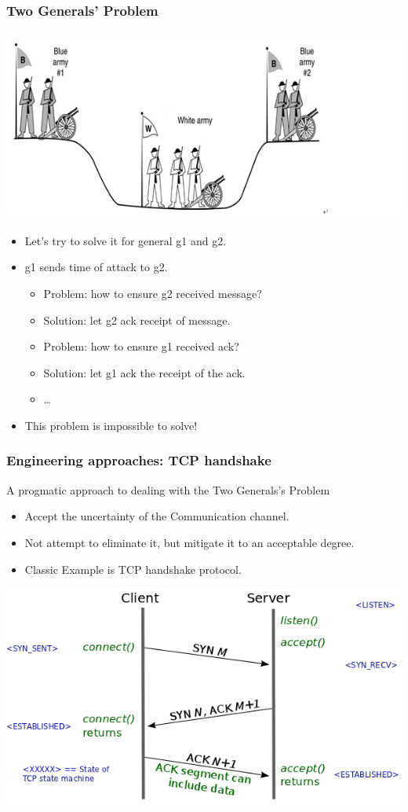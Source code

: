 \begin{frame}
    \frametitle{Two Generals' Problem}
    \includegraphics[scale=0.5]{./figures/two-generals-problem.png}
    \begin{itemize}
        \item Let's try to solve it for general g1 and g2.
        \item g1 sends \alert{time of attack} to g2.
            \begin{itemize}
                \item \alert{Problem}: how to ensure g2 received message?
                \item \alert{Solution}: let g2 ack receipt of message.
                \item \alert{Problem}: how to ensure g1 received ack?
                \item \alert{Solution}: let g1 ack the receipt of the ack.
                \item \ldots
            \end{itemize}
        \item This problem is \alert{impossible} to solve!
    \end{itemize}
\end{frame}

\begin{frame}
    \frametitle{Engineering approaches: TCP handshake}
    A progmatic approach to dealing with the Two Generals's Problem
    \begin{itemize}
        \item Accept the \alert{uncertainty} of the Communication channel.
        \item Not attempt to eliminate it, but mitigate it to an acceptable degree.
        \item Classic Example is TCP handshake protocol.
    \end{itemize}
    \includegraphics[scale=0.4]{./figures/tcp-handshake.png}
\end{frame}
